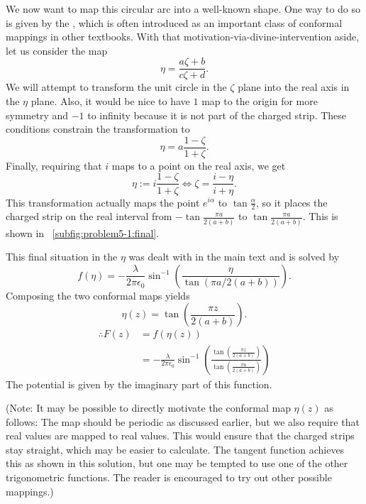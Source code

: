 We now want to map this circular arc into a well-known shape.
One way to do so is given by the
,
which is often introduced as an important class of conformal mappings in other textbooks.
With that motivation-via-divine-intervention aside, let us consider the map
\[
    \eta = \frac{a\zeta + b}{c\zeta + d}.
\]
We will attempt to transform the unit circle in the $\zeta$ plane
into the real axis in the $\eta$ plane.
Also, it would be nice to have $1$ map to the origin for more symmetry
and $-1$ to infinity because it is not part of the charged strip.
These conditions constrain the transformation to
\[
    \eta = a \frac{1 - \zeta}{1 + \zeta}.
\]
Finally, requiring that $i$ maps to a point on the real axis, we get
\[
    \eta := i \frac{1 - \zeta}{1 + \zeta}
    \Leftrightarrow \zeta = \frac{i - \eta}{i + \eta}.
\]
This transformation actually maps the point $e^{i\alpha}$ to $\tan\frac{\alpha}{2}$,
so it places the charged strip on the real interval
from $-\tan\frac{\pi a}{2(a+b)}$ to $\tan\frac{\pi a}{2(a+b)}$.
This is shown in ~\ref{subfig:problem5-1:final}.

This final situation in the $\eta$ was dealt with in the main text
and is solved by
\[
    f(\eta) = -\frac{\lambda}{2\pi\epsilon_0} \sin^{-1} \left(
        \frac{\eta}{\tan (\pi a / 2(a + b))}
    \right).
\]
Composing the two conformal maps yields
\[
    \eta(z) = \tan \left( \frac{\pi z}{2(a + b)} \right).
\]
\begin{align*}
    \therefore F(z)
    &= f(\eta(z)) \\
    &= -\frac{\lambda}{2\pi\epsilon_0} \sin^{-1} \left(
        \frac{\tan \left( \frac{\pi z}{2(a + b)} \right)}{\tan \left( \frac{\pi a}{2(a + b)} \right)}
    \right)
\end{align*}
The potential is given by the imaginary part of this function.

(Note: It may be possible to directly motivate the conformal map $\eta(z)$ as follows:
The map should be periodic as discussed earlier,
but we also require that real values are mapped to real values.
This would ensure that the charged strips stay straight, which may be easier to calculate.
The tangent function achieves this as shown in this solution,
but one may be tempted to use one of the other trigonometric functions.
The reader is encouraged to try out other possible mappings.)